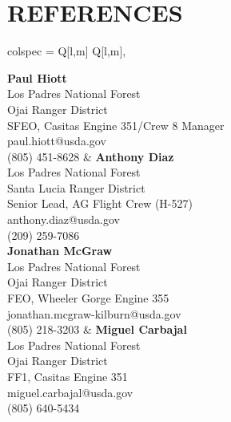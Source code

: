 \documentclass[a4paper,9pt]{extarticle}
\begin{document}
\section*{REFERENCES}

\begin{center}
\begin{tblr}{
    colspec = {Q[l,m] Q[l,m]},
}

{\textbf{Paul Hiott} \\
Los Padres National Forest \\
Ojai Ranger District \\
SFEO, Casitas Engine 351/Crew 8 Manager \\
paul.hiott@usda.gov \\
(805) 451-8628}
&
{\textbf{Anthony Diaz} \\
Los Padres National Forest \\
Santa Lucia Ranger District \\
Senior Lead, AG Flight Crew (H-527) \\
anthony.diaz@usda.gov \\
(209) 259-7086} \\

{\textbf{Jonathan McGraw} \\
Los Padres National Forest \\
Ojai Ranger District \\
FEO, Wheeler Gorge Engine 355 \\
jonathan.mcgraw-kilburn@usda.gov \\
(805) 218-3203}
&
{\textbf{Miguel Carbajal} \\
Los Padres National Forest \\
Ojai Ranger District \\
FF1, Casitas Engine 351 \\
miguel.carbajal@usda.gov \\
(805) 640-5434}

\end{tblr}
\end{center}
\end{document}
